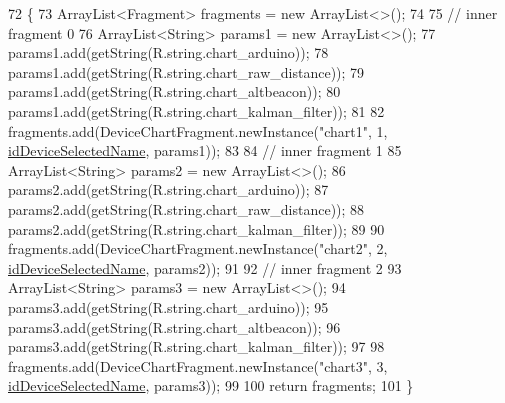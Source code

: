 \begin{DoxyCode}
72                                                \{
73         ArrayList<Fragment> fragments = \textcolor{keyword}{new} ArrayList<>();
74 
75         \textcolor{comment}{// inner fragment 0}
76         ArrayList<String> params1 = \textcolor{keyword}{new} ArrayList<>();
77         params1.add(getString(R.string.chart\_arduino));
78         params1.add(getString(R.string.chart\_raw\_distance));
79         params1.add(getString(R.string.chart\_altbeacon));
80         params1.add(getString(R.string.chart\_kalman\_filter));
81 
82         fragments.add(DeviceChartFragment.newInstance(\textcolor{stringliteral}{"chart1"}, 1, 
      \hyperlink{classit_1_1unibo_1_1torsello_1_1bluetoothpositioning_1_1fragment_1_1DeviceDetailInner2Fragment_a84cd6ba00a3c2e8b7a53cac62c73f1b5_a84cd6ba00a3c2e8b7a53cac62c73f1b5}{idDeviceSelectedName}, params1));
83 
84         \textcolor{comment}{// inner fragment 1}
85         ArrayList<String> params2 = \textcolor{keyword}{new} ArrayList<>();
86         params2.add(getString(R.string.chart\_arduino));
87         params2.add(getString(R.string.chart\_raw\_distance));
88         params2.add(getString(R.string.chart\_kalman\_filter));
89 
90         fragments.add(DeviceChartFragment.newInstance(\textcolor{stringliteral}{"chart2"}, 2, 
      \hyperlink{classit_1_1unibo_1_1torsello_1_1bluetoothpositioning_1_1fragment_1_1DeviceDetailInner2Fragment_a84cd6ba00a3c2e8b7a53cac62c73f1b5_a84cd6ba00a3c2e8b7a53cac62c73f1b5}{idDeviceSelectedName}, params2));
91 
92         \textcolor{comment}{// inner fragment 2}
93         ArrayList<String> params3 = \textcolor{keyword}{new} ArrayList<>();
94         params3.add(getString(R.string.chart\_arduino));
95         params3.add(getString(R.string.chart\_altbeacon));
96         params3.add(getString(R.string.chart\_kalman\_filter));
97 
98         fragments.add(DeviceChartFragment.newInstance(\textcolor{stringliteral}{"chart3"}, 3, 
      \hyperlink{classit_1_1unibo_1_1torsello_1_1bluetoothpositioning_1_1fragment_1_1DeviceDetailInner2Fragment_a84cd6ba00a3c2e8b7a53cac62c73f1b5_a84cd6ba00a3c2e8b7a53cac62c73f1b5}{idDeviceSelectedName}, params3));
99 
100         \textcolor{keywordflow}{return} fragments;
101     \}
\end{DoxyCode}
\hypertarget{classit_1_1unibo_1_1torsello_1_1bluetoothpositioning_1_1fragment_1_1DeviceDetailInner2Fragment_a27471a2d140a8dd11636ef23ffc20657_a27471a2d140a8dd11636ef23ffc20657}{}\label{classit_1_1unibo_1_1torsello_1_1bluetoothpositioning_1_1fragment_1_1DeviceDetailInner2Fragment_a27471a2d140a8dd11636ef23ffc20657_a27471a2d140a8dd11636ef23ffc20657} 
